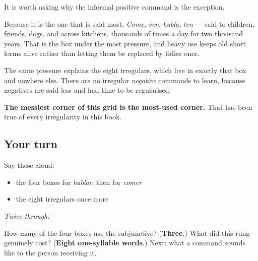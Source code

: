 \begin{grammarlens}[title={Grammar Lens: why the odd box is the odd one}]
It is worth asking why the informal positive command is the exception.

Because it is the one that is said most. \emph{Come}, \emph{ven}, \emph{habla}, \emph{ten} — said to children, friends, dogs, and across kitchens, thousands of times a day for two thousand years. That is the box under the most pressure, and heavy use keeps old short forms alive rather than letting them be replaced by tidier ones.

The same pressure explains the eight irregulars, which live in exactly that box and nowhere else. There are no irregular \emph{negative} commands to learn, because negatives are said less and had time to be regularised.

\textbf{The messiest corner of this grid is the most-used corner.} That has been true of every irregularity in this book.
\end{grammarlens}

\subsection*{Your turn}
Say these aloud:

\begin{itemize}
\raggedright
  \item the four boxes for \emph{hablar}, then for \emph{comer}
  \item the eight irregulars once more
\end{itemize}

\emph{Twice through:}

\begin{tcolorbox}[breakable,colback=teal!4,colframe=teal!35!black,title={Before you move on}]
How many of the four boxes use the subjunctive? (\textbf{Three}.) What did this rung genuinely cost? (\textbf{Eight one-syllable words}.) Next: what a command sounds like to the person receiving it.
\end{tcolorbox}
